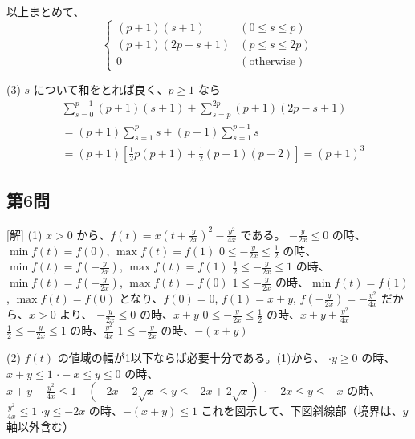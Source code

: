 \documentclass[../main.tex]{subfiles}
\begin{document}
以上まとめて、
\[
  \begin{cases}
    (p+1)(s+1) & (0 \le s \le p) \\
    (p+1)(2p-s+1) & (p \le s \le 2p) \\
    0 & (\text{otherwise})
\end{cases} \]

(3) $s$ について和をとれば良く、$p \ge 1$ なら
\begin{align*}
  &\sum_{s=0}^{p-1} (p+1)(s+1) + \sum_{s=p}^{2p} (p+1)(2p-s+1) \\
  &= (p+1) \sum_{s=1}^{p} s + (p+1) \sum_{s=1}^{p+1} s \\
  &= (p+1) \left[ \frac{1}{2}p(p+1) + \frac{1}{2}(p+1)(p+2) \right] = (p+1)^3
\end{align*}

\subsection*{第6問}
[解] (1) $x>0$ から、$f(t) = x(t + \frac{y}{2x})^2 - \frac{y^2}{4x}$ である。
$-\frac{y}{2x} \le 0$ の時、$\min f(t) = f(0)$, $\max f(t) = f(1)$
$0 \le -\frac{y}{2x} \le \frac{1}{2}$ の時、$\min f(t) = f(-\frac{y}{2x})$, $\max f(t) = f(1)$
$\frac{1}{2} \le -\frac{y}{2x} \le 1$ の時、$\min f(t) = f(-\frac{y}{2x})$, $\max f(t) = f(0)$
$1 \le -\frac{y}{2x}$ の時、$\min f(t) = f(1)$, $\max f(t) = f(0)$
となり、$f(0)=0$, $f(1)=x+y$, $f(-\frac{y}{2x}) = -\frac{y^2}{4x}$ だから、$x>0$ より、
$-\frac{y}{2x} \le 0$ の時、$x+y$
$0 \le -\frac{y}{2x} \le \frac{1}{2}$ の時、$x+y + \frac{y^2}{4x}$
$\frac{1}{2} \le -\frac{y}{2x} \le 1$ の時、$\frac{y^2}{4x}$
$1 \le -\frac{y}{2x}$ の時、$-(x+y)$

(2) $f(t)$ の値域の幅が1以下ならば必要十分である。(1)から、
$\cdot y \ge 0$ の時、$x+y \le 1$
$\cdot -x \le y \le 0$ の時、$x+y + \frac{y^2}{4x} \le 1 \quad (-2x-2\sqrt{x} \le y \le -2x+2\sqrt{x})$
$\cdot -2x \le y \le -x$ の時、$\frac{y^2}{4x} \le 1$
$\cdot y \le -2x$ の時、$-(x+y) \le 1$
これを図示して、下図斜線部（境界は、$y$軸以外含む）

\begin{center}
\end{center}
\end{document}
